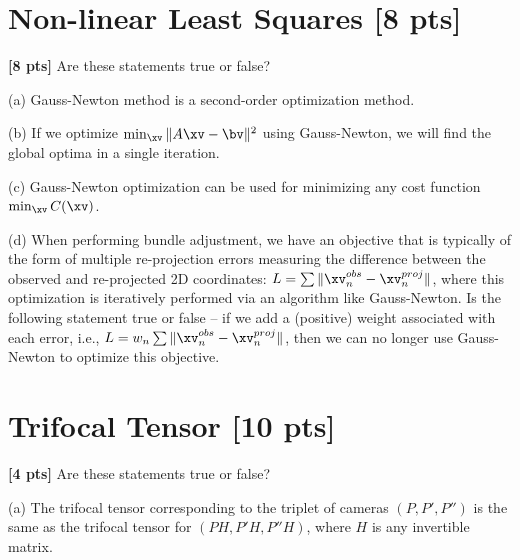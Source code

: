 \documentclass[11pt,addpoints,answers]{exam}
\numberwithin{equation}{section} %
\numberwithin{figure}{section} %
\numberwithin{table}{section} %
\begin{document}
\begin{questions}
\begin{tcolorbox}[fit,height=19cm, width=\textwidth, blank, borderline={0.5pt}{-2pt},halign=left, valign=center, nobeforeafter]

\end{tcolorbox}

\newpage

\section{Non-linear Least Squares [8 pts]}

\question \textbf{[8 pts]} Are these statements true or false?  

(a) Gauss-Newton method is a second-order optimization method.

(b) If we optimize $\min_\xv \|A\xv-\bv\|^2$ using Gauss-Newton, we will find the global optima in a single iteration. 

(c) Gauss-Newton optimization can be used for minimizing any cost function $\min_{\xv} C(\xv)$.

(d) When performing bundle adjustment, we have an objective that is typically of the form of multiple re-projection errors measuring the difference between the observed and re-projected 2D coordinates: $L = \sum \| \xv^{obs}_{n} - \xv^{proj}_n \|$, where this optimization is iteratively performed via an algorithm like Gauss-Newton. Is the following statement true or false -- if we  add a (positive) weight associated with each error, i.e., $L = w_n \sum \| \xv^{obs}_{n} - \xv^{proj}_n \|$, then we can no longer use Gauss-Newton to optimize this objective.

\begin{tcolorbox}[fit,height=14cm, width=\textwidth, blank, borderline={0.5pt}{-2pt},halign=left, valign=center, nobeforeafter]


\end{tcolorbox}

\newpage

\section{Trifocal Tensor [10 pts]}

\question \textbf{[4 pts]} Are these statements true or false?  

(a) The trifocal tensor corresponding to the triplet of cameras $(P, P', P'')$ is the same as the trifocal tensor for $(PH, P'H, P''H)$, where $H$ is any invertible matrix.


\end{questions}
\end{document}

